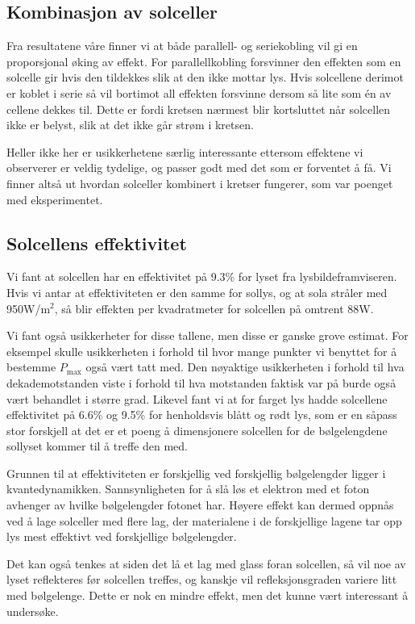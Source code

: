 \documentclass[a4paper,11pt, twocolumn]{article}
\begin{document}
\subsection{Kombinasjon av solceller}
Fra resultatene våre finner vi at både parallell- og seriekobling vil gi en proporsjonal øking av effekt. For parallellkobling forsvinner den effekten som en solcelle gir hvis den tildekkes slik at den ikke mottar lys. Hvis solcellene derimot er koblet i serie så vil bortimot all effekten forsvinne dersom så lite som \'en av cellene dekkes til. Dette er fordi kretsen nærmest blir kortsluttet når solcellen ikke er belyst, slik at det ikke går strøm i kretsen.

Heller ikke her er usikkerhetene særlig interessante ettersom effektene vi observerer er veldig tydelige, og passer godt med det som er forventet å få. Vi finner altså ut hvordan solceller kombinert i kretser fungerer, som var poenget med eksperimentet.

\subsection{Solcellens effektivitet} 
Vi fant at solcellen har en effektivitet på 9.3\% for lyset fra lysbildeframviseren. Hvis vi antar at effektiviteten er den samme for sollys, og at sola stråler med 950W/m$^2$, så blir effekten per kvadratmeter for solcellen på omtrent 88W.

Vi fant også usikkerheter for disse tallene, men disse er ganske grove estimat. For eksempel skulle usikkerheten i forhold til hvor mange punkter vi benyttet for å bestemme $P_\text{max}$ også vært tatt med. Den nøyaktige usikkerheten i forhold til hva dekademotstanden viste i forhold til hva motstanden faktisk var på burde også vært behandlet i større grad. Likevel fant vi at for farget lys hadde solcellene effektivitet på 6.6\% og 9.5\% for henholdsvis blått og rødt lys, som er en såpass stor forskjell at det er et poeng å dimensjonere solcellen for de bølgelengdene sollyset kommer til å treffe den med. 

Grunnen til at effektiviteten er forskjellig ved forskjellig bølgelengder ligger i kvantedynamikken. Sannsynligheten for å slå løs et elektron med et foton avhenger av hvilke bølgelengder fotonet har. Høyere effekt kan dermed oppnås ved å lage solceller med flere lag, der materialene i de forskjellige lagene tar opp lys mest effektivt ved forskjellige bølgelengder. 

Det kan også tenkes at siden det lå et lag med glass foran solcellen, så vil noe av lyset reflekteres før solcellen treffes, og kanskje vil refleksjonsgraden variere litt med bølgelenge. Dette er nok en mindre effekt, men det kunne vært interessant å undersøke.
\end{document}
